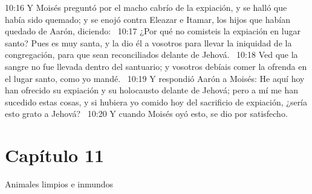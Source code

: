 10:16 Y Moisés preguntó por el macho cabrío de la expiación, y se halló que había sido quemado; y se enojó contra Eleazar e Itamar, los hijos que habían quedado de Aarón, diciendo:  
10:17 ¿Por qué no comisteis la expiación en lugar santo? Pues es muy santa, y la dio él a vosotros para llevar la iniquidad de la congregación, para que sean reconciliados delante de Jehová.  
10:18 Ved que la sangre no fue llevada dentro del santuario; y vosotros debíais comer la ofrenda en el lugar santo, como yo mandé.  
10:19 Y respondió Aarón a Moisés: He aquí hoy han ofrecido su expiación y su holocausto delante de Jehová; pero a mí me han sucedido estas cosas, y si hubiera yo comido hoy del sacrificio de expiación, ¿sería esto grato a Jehová?  
10:20 Y cuando Moisés oyó esto, se dio por satisfecho.  
\section*{Capítulo 11}
Animales limpios e inmundos  

